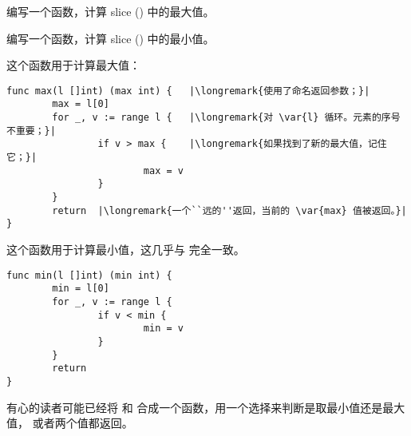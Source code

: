 \begin{Exercise}[title={最小值和最大值},difficulty=3]
\label{ex:minmax}
\Question\label{ex:minmax q1} 编写一个函数，计算  slice () 中的最大值。

\Question\label{ex:minmax q2} 编写一个函数，计算  slice () 中的最小值。

\end{Exercise}

\begin{Answer}
\Question 这个函数用于计算最大值：
\begin{lstlisting}
func max(l []int) (max int) {   |\longremark{使用了命名返回参数；}|
        max = l[0]      
        for _, v := range l {   |\longremark{对 \var{l} 循环。元素的序号不重要；}|
                if v > max {    |\longremark{如果找到了新的最大值，记住它；}|
                        max = v 
                }   
        }   
        return  |\longremark{一个``远的''返回，当前的 \var{max} 值被返回。}|
}
\end{lstlisting}
\showremarks

\Question 这个函数用于计算最小值，这几乎与  完全一致。
\begin{lstlisting}
func min(l []int) (min int) {
        min = l[0]
        for _, v := range l { 
                if v < min {
                        min = v 
                }   
        }   
        return
}
\end{lstlisting}
有心的读者可能已经将  和  合成一个函数，用一个选择来判断是取最小值还是最大值，
或者两个值都返回。
\end{Answer}
